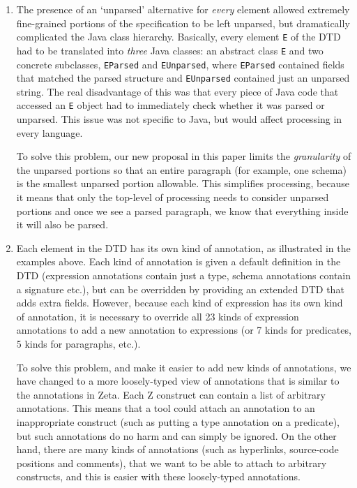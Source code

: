\documentclass{llncs}  %
\newcommand{\Zeta}{Zeta}
\begin{document}
\begin{enumerate}
\item The presence of an `unparsed' alternative for \emph{every} element
  allowed extremely fine-grained portions of the specification to be left
  unparsed, but dramatically complicated the Java class hierarchy.
  Basically, every element \verb!E! of the DTD had to be translated into
  \emph{three} Java classes: an abstract class \verb!E! and two concrete 
  subclasses, \verb!EParsed! and \verb!EUnparsed!, where \verb!EParsed!
  contained fields that matched the parsed structure and \verb!EUnparsed!
  contained just an unparsed string.  The real disadvantage of this was
  that every piece of Java code that accessed an \verb!E! object had to
  immediately check whether it was parsed or unparsed.  This issue was not
  specific to Java, but would affect processing in every language.
  
  To solve this problem, our new proposal in this paper limits the
  \emph{granularity} of the unparsed portions so that an entire paragraph
  (for example, one schema) is the smallest
  unparsed portion allowable.  This simplifies processing, because it means
  that only the top-level of processing needs to consider unparsed portions
  and once we see a parsed paragraph, we know that everything inside it
  will also be parsed.

\item Each element in the DTD has its own kind of annotation, as
  illustrated in the examples above.  Each kind of annotation is given
  a default definition in the DTD (expression annotations contain just a
  type, schema annotations contain a signature etc.), but can be
  overridden by providing an extended DTD that adds extra fields.
  However, because each kind of expression has its own kind of annotation,
  it is necessary to override all 23 kinds of expression annotations
  to add a new annotation to expressions (or 7 kinds for predicates, 
  5 kinds for paragraphs, etc.).
  
  To solve this problem, and make it easier to add new kinds of
  annotations, we have changed to a more loosely-typed view of annotations
  that is similar to the annotations in \Zeta.  Each Z construct can contain
  a list of arbitrary annotations.  This
  means that a tool could attach an annotation to an inappropriate
  construct (such as putting a type annotation on a predicate), but such
  annotations do no harm and can simply be ignored.  On the other hand,
  there are many kinds of annotations (such as hyperlinks, source-code
  positions and comments), that we want to be able to attach to arbitrary
  constructs, and this is easier with these loosely-typed annotations.
  

\end{enumerate}
\end{document}
